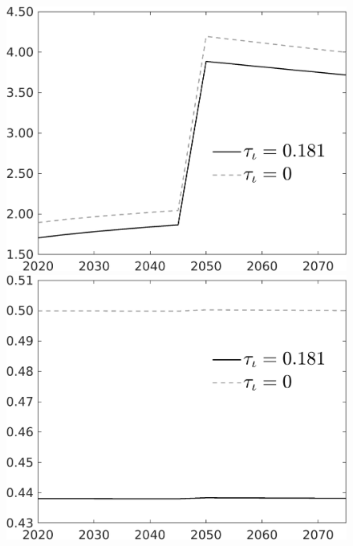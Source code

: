 \documentclass[12pt]{article}
\begin{document}
\begin{figure}[h!!]
\begin{minipage}[]{0.32\textwidth}
		\includegraphics[width=1\textwidth]{../../codding_model/own_basedOnFried/optimalPol_010922_revision/figures/all_13Sept22/CompTauf_bytaul_Reg0_tauf_spillover0_nsk0_xgr0_knspil1_sep1_LFlimit1_emsbase0_countec0_GovRev0_etaa0.79_lgd1.png}
	\end{minipage}	
	\begin{minipage}[]{0.32\textwidth}
		\includegraphics[width=1\textwidth]{../../codding_model/own_basedOnFried/optimalPol_010922_revision/figures/all_13Sept22/CompTauf_bytaul_Reg0_hh_spillover0_nsk0_xgr0_knspil1_sep1_LFlimit1_emsbase0_countec0_GovRev0_etaa0.79_lgd1.png}

\end{minipage}
\end{figure}
\end{document}
